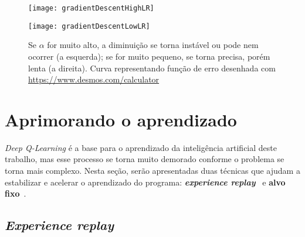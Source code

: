 \begin{figure}[h!]
  \begin{minipage}[b]{.45\textwidth}
  \centering
  \texttt{[image: gradientDescentHighLR]}
  \label{fig:gdhighlr}
  \end{minipage}
  \hfill
  \begin{minipage}[b]{.45\textwidth}
  \centering
  \texttt{[image: gradientDescentLowLR]}
  \label{fig:gdlowlr}
  \end{minipage}
  \caption{Se $\alpha$ for muito alto, a diminuição se torna instável ou pode nem ocorrer (a esquerda); se for muito pequeno, se torna precisa, porém lenta (a direita). Curva representando função de erro desenhada com \url{https://www.desmos.com/calculator}}
  \label{fig:gradientDescent}
\end{figure}



\section{Aprimorando o aprendizado}
\label{sec:enhance}

\textit{Deep Q-Learning} é a base para o aprendizado da inteligência artificial deste trabalho, mas esse processo se torna muito demorado conforme o problema se torna mais complexo.
Nesta seção, serão apresentadas duas técnicas que ajudam a estabilizar e acelerar o aprendizado do programa:
\textit{\textbf{experience replay}}~\cite{Lin1992} e \textbf{alvo fixo}~\cite{humanLevelControlDRL}.


\subsection{\textit{Experience replay}}
\label{sec:er}

